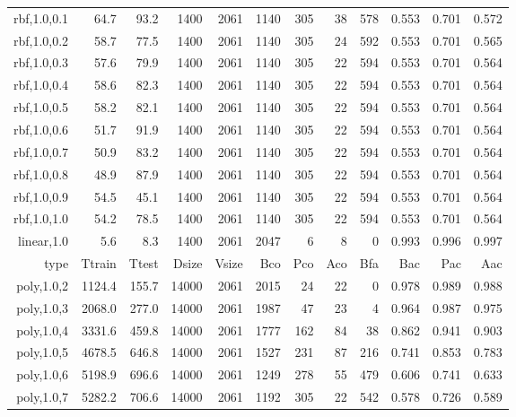 \begin{longtable}{r|r|r|r|r|r|r|r|r|r|r|r}
  rbf,1.0,0.1  &    64.7 &    93.2 &  1400 &  2061 &  1140 &   305 &    38 &   578 & 0.553 & 0.701 & 0.572 \\
  rbf,1.0,0.2  &    58.7 &    77.5 &  1400 &  2061 &  1140 &   305 &    24 &   592 & 0.553 & 0.701 & 0.565 \\
  rbf,1.0,0.3  &    57.6 &    79.9 &  1400 &  2061 &  1140 &   305 &    22 &   594 & 0.553 & 0.701 & 0.564 \\
  rbf,1.0,0.4  &    58.6 &    82.3 &  1400 &  2061 &  1140 &   305 &    22 &   594 & 0.553 & 0.701 & 0.564 \\
  rbf,1.0,0.5  &    58.2 &    82.1 &  1400 &  2061 &  1140 &   305 &    22 &   594 & 0.553 & 0.701 & 0.564 \\
  rbf,1.0,0.6  &    51.7 &    91.9 &  1400 &  2061 &  1140 &   305 &    22 &   594 & 0.553 & 0.701 & 0.564 \\
  rbf,1.0,0.7  &    50.9 &    83.2 &  1400 &  2061 &  1140 &   305 &    22 &   594 & 0.553 & 0.701 & 0.564 \\
  rbf,1.0,0.8  &    48.9 &    87.9 &  1400 &  2061 &  1140 &   305 &    22 &   594 & 0.553 & 0.701 & 0.564 \\
  rbf,1.0,0.9  &    54.5 &    45.1 &  1400 &  2061 &  1140 &   305 &    22 &   594 & 0.553 & 0.701 & 0.564 \\
  rbf,1.0,1.0  &    54.2 &    78.5 &  1400 &  2061 &  1140 &   305 &    22 &   594 & 0.553 & 0.701 & 0.564 \\
   linear,1.0  &     5.6 &     8.3 &  1400 &  2061 &  2047 &     6 &     8 &     0 & 0.993 & 0.996 & 0.997 \\
          type &  Ttrain &   Ttest & Dsize & Vsize &   Bco &   Pco &   Aco &   Bfa &   Bac &   Pac &   Aac \\
   poly,1.0,2  &  1124.4 &   155.7 & 14000 &  2061 &  2015 &    24 &    22 &     0 & 0.978 & 0.989 & 0.988 \\
   poly,1.0,3  &  2068.0 &   277.0 & 14000 &  2061 &  1987 &    47 &    23 &     4 & 0.964 & 0.987 & 0.975 \\
   poly,1.0,4  &  3331.6 &   459.8 & 14000 &  2061 &  1777 &   162 &    84 &    38 & 0.862 & 0.941 & 0.903 \\
   poly,1.0,5  &  4678.5 &   646.8 & 14000 &  2061 &  1527 &   231 &    87 &   216 & 0.741 & 0.853 & 0.783 \\
   poly,1.0,6  &  5198.9 &   696.6 & 14000 &  2061 &  1249 &   278 &    55 &   479 & 0.606 & 0.741 & 0.633 \\
   poly,1.0,7  &  5282.2 &   706.6 & 14000 &  2061 &  1192 &   305 &    22 &   542 & 0.578 & 0.726 & 0.589 \\

\end{longtable}
